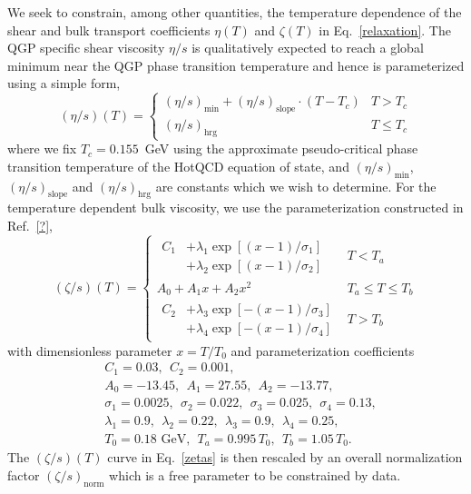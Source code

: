 \documentclass[aps,prc,reprint,amsmath,nofootinbib]{revtex4-1}
\begin{document}
We seek to constrain, among other quantities, the temperature dependence of the shear and bulk transport coefficients $\eta(T)$ and $\zeta(T)$ in Eq.~\eqref{relaxation}.
The QGP specific shear viscosity $\eta/s$ is qualitatively expected to reach a global minimum near the QGP phase transition temperature and hence is parameterized using a simple form,
\begin{equation}
    (\eta/s)(T) = 
    \begin{cases}
        (\eta/s)_\text{min} + (\eta/s)_\text{slope} \cdot (T - T_c) &T > T_c \\
        (\eta/s)_\text{hrg} &T \le T_c
    \end{cases}
\end{equation}
where we fix $T_c = 0.155$~GeV using the approximate pseudo-critical phase transition temperature of the HotQCD equation of state, and $(\eta/s)_\text{min}$, $(\eta/s)_\text{slope}$ and $(\eta/s)_\text{hrg}$ are constants which we wish to determine.
For the temperature dependent bulk viscosity, we use the parameterization constructed in Ref.~\ref{?},
\begin{equation}
    \label{zetas}
    (\zeta/s)(T) = 
    \begin{cases}
        \begin{aligned}
            C_1 &+ \lambda_1 \exp [(x-1)/\sigma_1]  \\ &+ \lambda_2 \exp [ (x-1)/\sigma_2]
        \end{aligned}
        &T < T_a \\[3ex]
        A_0 + A_1 x + A_2 x^2 &T_a \le T \le T_b \\[2ex]
        \begin{aligned}
            C_2 &+ \lambda_3 \exp [-(x-1)/\sigma_3]  \\ &+ \lambda_4 \exp [-(x-1)/\sigma_4]
        \end{aligned}
        &T > T_b
    \end{cases}
\end{equation}
with dimensionless parameter $x = T/T_0$ and parameterization coefficients
\begin{align*}
    &C_1=0.03, ~~C_2=0.001, \\ 
    &A_0=-13.45, ~~A_1=27.55, ~~A_2=-13.77, \\
    &\sigma_1=0.0025, ~~\sigma_2=0.022, ~~\sigma_3=0.025, ~~\sigma_4=0.13, \\
    &\lambda_1=0.9, ~~\lambda_2=0.22, ~~\lambda_3=0.9, ~~\lambda_4=0.25, \\
    &T_0 = 0.18 \text{ GeV}, ~~T_a = 0.995\, T_0, ~~T_b = 1.05\, T_0.
\end{align*}
The $(\zeta/s)(T)$ curve in Eq.~\eqref{zetas} is then rescaled by an overall normalization factor $(\zeta/s)_\text{norm}$ which is a free parameter to be constrained by data. 
\end{document}
